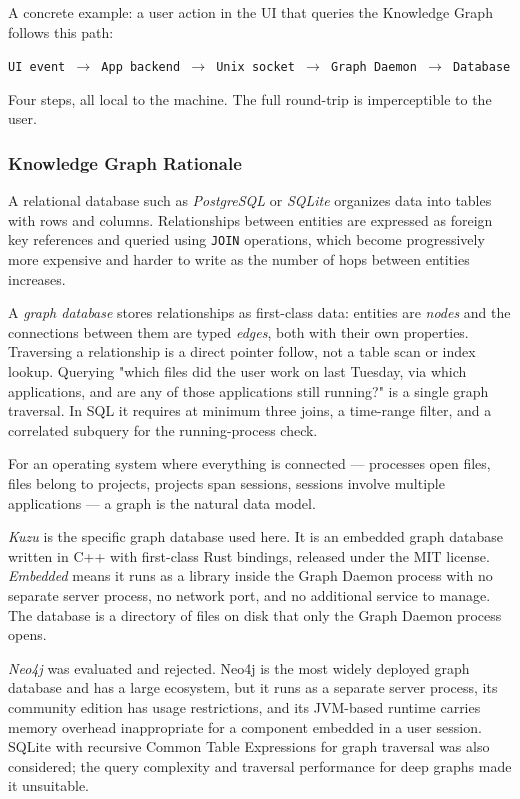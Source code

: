 A concrete example: a user action in the UI that queries the Knowledge Graph
follows this path:

\begin{center}
\texttt{UI event $\to$ App backend $\to$ Unix socket $\to$ Graph Daemon $\to$ Database}
\end{center}

Four steps, all local to the machine. The full round-trip is imperceptible to
the user.

\subsubsection{Knowledge Graph Rationale}
\label{sec:kg-rationale}

A relational database such as \emph{PostgreSQL} or \emph{SQLite} organizes data
into tables with rows and columns. Relationships between entities are expressed
as foreign key references and queried using \texttt{JOIN} operations, which
become progressively more expensive and harder to write as the number of hops
between entities increases.

A \emph{graph database} stores relationships as first-class data: entities are
\emph{nodes} and the connections between them are typed \emph{edges}, both with
their own properties. Traversing a relationship is a direct pointer follow,
not a table scan or index lookup. Querying "which files did the user work on
last Tuesday, via which applications, and are any of those applications still
running?" is a single graph traversal. In SQL it requires at minimum three joins,
a time-range filter, and a correlated subquery for the running-process check.

For an operating system where everything is connected --- processes open files,
files belong to projects, projects span sessions, sessions involve multiple
applications --- a graph is the natural data model.

\emph{Kuzu} is the specific graph database used here. It is an embedded graph
database written in C++ with first-class Rust bindings, released under the MIT
license. \emph{Embedded} means it runs as a library inside the Graph Daemon
process with no separate server process, no network port, and no additional
service to manage. The database is a directory of files on disk that only the
Graph Daemon process opens.

\emph{Neo4j} was evaluated and rejected. Neo4j is the most widely deployed
graph database and has a large ecosystem, but it runs as a separate server
process, its community edition has usage restrictions, and its JVM-based runtime
carries memory overhead inappropriate for a component embedded in a user session.
SQLite with recursive Common Table Expressions for graph traversal was also
considered; the query complexity and traversal performance for deep graphs made
it unsuitable.

